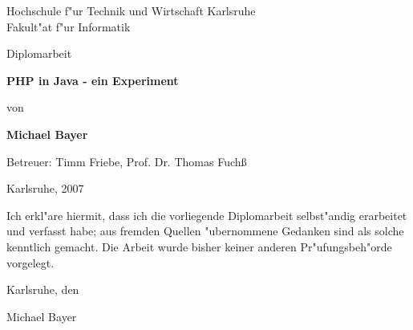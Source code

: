 

\pagestyle{empty}
\sffamily

\noindent
\begin{center}
    \Large
    Hochschule f"ur Technik und Wirtschaft Karlsruhe\\
    Fakult"at f"ur Informatik\\
\end{center}

\vfill\vfill
\begin{center}
    \large
    Diplomarbeit\\
\end{center}

\vfill
\begin{center}
    \Huge\bfseries
    PHP in Java - ein Experiment
\end{center}

\vfill
\begin{center}
    \Large
    von 
\end{center}

\vfill
\begin{center}
    \huge\bfseries
    Michael Bayer
\end{center}

\vfill\vfill\vfill
\begin{center}
    \Large
    Betreuer: Timm Friebe,  Prof. Dr. Thomas Fuch\ss
\end{center}

\vfill
\begin{center}
\large
    Karlsruhe, 2007
\end{center}

\cleardoublepage

\pagestyle{empty}
Ich erkl"are hiermit, dass ich die vorliegende Diplomarbeit 
selbst"andig erarbeitet und verfasst habe; aus fremden Quellen 
"ubernommene Gedanken sind als solche kenntlich gemacht. Die Arbeit 
wurde bisher keiner anderen Pr"ufungsbeh"orde vorgelegt. 

\vspace{1cm}
Karlsruhe, den 

\vspace{2cm}
\hfill Michael Bayer

